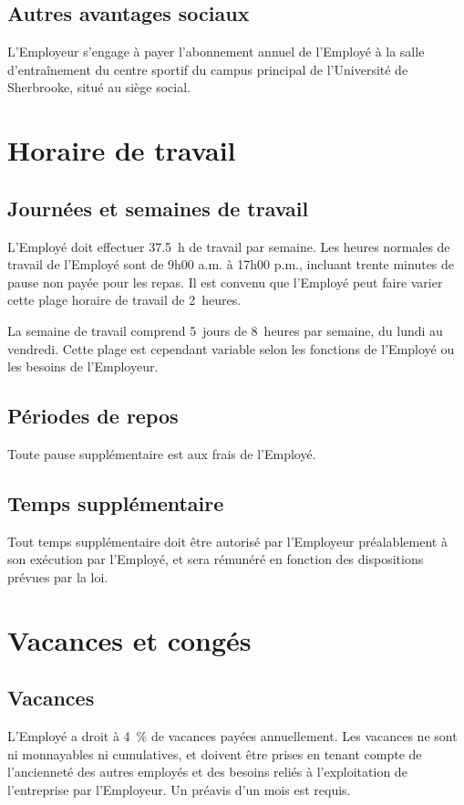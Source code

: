 \documentclass{article}
\begin{document}
    	\subsection{Autres avantages sociaux}
    	L'Employeur s'engage à payer l'abonnement annuel de l'Employé à la salle d'entraînement du centre sportif du campus principal de l'Université de Sherbrooke, situé au siège social.
    	       	
    
    \section{Horaire de travail}
    	\subsection{Journées et semaines de travail}
    	L'Employé doit effectuer \SI{37,5}{h} de travail par semaine. Les heures normales de travail de l'Employé sont de 9h00 a.m. à 17h00 p.m., incluant trente minutes de pause non payée pour les repas. Il est convenu que l'Employé peut faire varier cette plage horaire de travail de 2~heures.
    	
    	La semaine de travail comprend 5~jours de 8~heures par semaine, du lundi au vendredi. Cette plage est cependant variable selon les fonctions de l'Employé ou les besoins de l'Employeur.
    	
    	\subsection{Périodes de repos}
    	Toute pause supplémentaire est aux frais de l'Employé.
    	
    	\subsection{Temps supplémentaire}
    	Tout temps supplémentaire doit être autorisé par l'Employeur préalablement à son exécution par l'Employé, et sera rémunéré en fonction des dispositions prévues par la loi.  	
    	
    \section{Vacances et congés}
    	\subsection{Vacances}
    	L'Employé a droit à \SI{4}{\%} de vacances payées annuellement. Les vacances ne sont ni monnayables ni cumulatives, et doivent être prises en tenant compte de l'ancienneté des autres employés et des besoins reliés à l'exploitation de l'entreprise par l'Employeur. Un préavis d'un mois est requis.    	
    	
\end{document}
